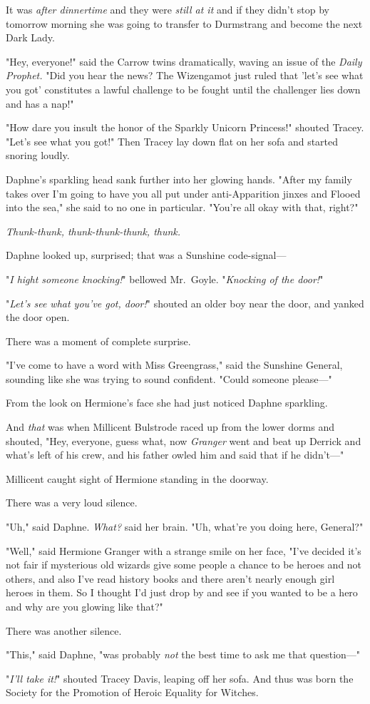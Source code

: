 It was \emph{after dinnertime} and they were\emph{ still at it} and if they 
didn't stop by tomorrow morning she was going to transfer to Durmstrang and 
become the next Dark Lady.

"Hey, everyone!" said the Carrow twins dramatically, waving an issue of the 
\emph{Daily Prophet.} "Did you hear the news? The Wizengamot just ruled that 
'let's see what you got' constitutes a lawful challenge to be fought until the 
challenger lies down and has a nap!"

"How dare you insult the honor of the Sparkly Unicorn Princess!" shouted 
Tracey. "Let's see what you got!" Then Tracey lay down flat on her sofa and 
started snoring loudly.

Daphne's sparkling head sank further into her glowing hands. "After my family 
takes over I'm going to have you all put under anti-Apparition jinxes and 
Flooed into the sea," she said to no one in particular. "You're all okay with 
that, right?"

\emph{Thunk-thunk, thunk-thunk-thunk, thunk.}

Daphne looked up, surprised; that was a Sunshine code-signal---

"\emph{I hight someone knocking!}" bellowed Mr.~Goyle. "\emph{Knocking of the 
door!}"

"\emph{Let's see what you've got, door!}" shouted an older boy near the door, 
and yanked the door open.

There was a moment of complete surprise.

"I've come to have a word with Miss Greengrass," said the Sunshine General, 
sounding like she was trying to sound confident. "Could someone please---"

From the look on Hermione's face she had just noticed Daphne sparkling.

And \emph{that} was when Millicent Bulstrode raced up from the lower dorms and 
shouted, "Hey, everyone, guess what, now \emph{Granger} went and beat up 
Derrick and what's left of his crew, and his father owled him and said that if 
he didn't---"

Millicent caught sight of Hermione standing in the doorway.

There was a very loud silence.

"Uh," said Daphne. \emph{What?} said her brain. "Uh, what're you doing here, 
General?"

"Well," said Hermione Granger with a strange smile on her face, "I've decided 
it's not fair if mysterious old wizards give some people a chance to be heroes 
and not others, and also I've read history books and there aren't nearly enough 
girl heroes in them. So I thought I'd just drop by and see if you wanted to be 
a hero and why are you glowing like that?"

There was another silence.

"This," said Daphne, "was probably \emph{not} the best time to ask me that 
question---"

"\emph{I'll take it!}" shouted Tracey Davis, leaping off her sofa.
\sbreak
And thus was born the Society for the Promotion of Heroic Equality for Witches.